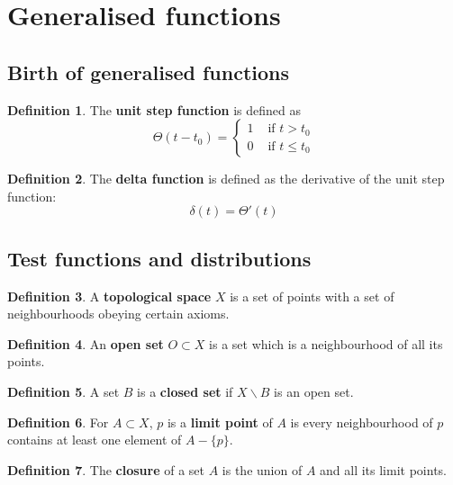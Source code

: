 \documentclass[12pt,a4paper]{article}
\theoremstyle{definition}
\newtheorem{definition}{Definition}[subsection]
\begin{document}
\section{Generalised functions}

\subsection{Birth of generalised functions}

\begin{definition}
	The \textbf{unit step function} is defined as
	\[
		\Theta (t - t_0) = \begin{cases}
			1 & \text{ if } t > t_0 \\
			0 & \text{ if } t \le t_0
		\end{cases}
	\]
\end{definition}

\begin{definition}
	The \textbf{delta function} is defined as the derivative of the unit step function:
	\[
		\delta(t) = \Theta'(t)
	\]
\end{definition}

\subsection{Test functions and distributions}

\begin{definition}
	A \textbf{topological space} $X$ is a set of points with a set of neighbourhoods obeying certain axioms.
\end{definition}

\begin{definition}
	An \textbf{open set} $O \subset X$ is a set which is a neighbourhood of all its points.
\end{definition}

\begin{definition}
	A set $B$ is a \textbf{closed set} if $X \backslash B$ is an open set.
\end{definition}

\begin{definition}
	For $A \subset X$, $p$ is a \textbf{limit point} of $A$ is every neighbourhood of $p$ contains at least one element of $A - \{ p \}$.
\end{definition}

\begin{definition}
	The \textbf{closure} of a set $A$ is the union of $A$ and all its limit points.
\end{definition}
\end{document}
